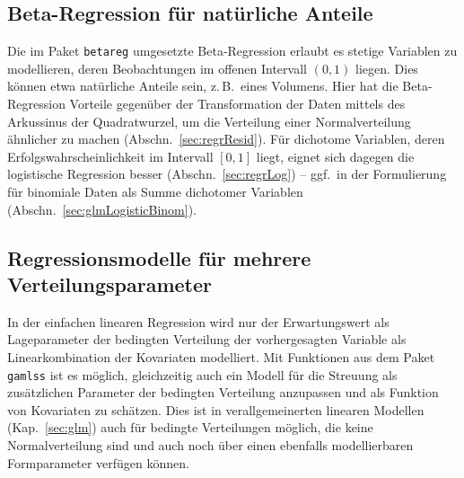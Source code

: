 \subsection{Beta-Regression für natürliche Anteile}
\label{sec:betaReg}

Die im Paket \lstinline!betareg! \cite{CribariNeto2010,Grun2010} umgesetzte Beta-Regression erlaubt es stetige Variablen zu modellieren, deren Beobachtungen im offenen Intervall $(0, 1)$ liegen. Dies können etwa natürliche Anteile sein, z.\,B.\ eines Volumens. Hier hat die Beta-Regression Vorteile gegenüber der Transformation der Daten mittels des Arkussinus der Quadratwurzel, um die Verteilung einer Normalverteilung ähnlicher zu machen (Abschn.\ \ref{sec:regrResid}). Für dichotome Variablen, deren Erfolgswahrscheinlichkeit im Intervall $[0,1]$ liegt, eignet sich dagegen die logistische Regression besser (Abschn.\ \ref{sec:regrLog}) -- ggf.\ in der Formulierung für binomiale Daten als Summe dichotomer Variablen (Abschn.\ \ref{sec:glmLogisticBinom}).

\subsection{Regressionsmodelle für mehrere Verteilungsparameter}
\label{sec:gamlss}

In der einfachen linearen Regression wird nur der Erwartungswert als Lageparameter der bedingten Verteilung der vorhergesagten Variable als Linearkombination der Kovariaten modelliert. Mit Funktionen aus dem Paket \lstinline!gamlss! \cite{Stasinopoulos2017} ist es möglich, gleichzeitig auch ein Modell für die Streuung als zusätzlichen Parameter der bedingten Verteilung anzupassen und als Funktion von Kovariaten zu schätzen. Dies ist in verallgemeinerten linearen Modellen (Kap.\ \ref{sec:glm}) auch für bedingte Verteilungen möglich, die keine Normalverteilung sind und auch noch über einen ebenfalls modellierbaren Formparameter verfügen können.

